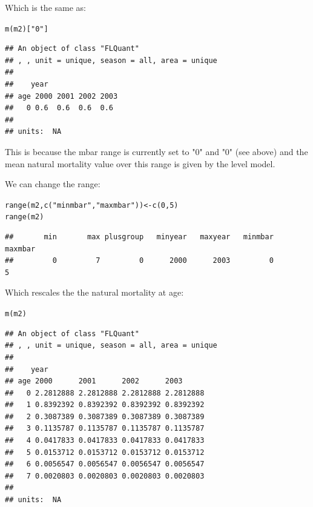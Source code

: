 \documentclass[a4paper,english,10pt]{article}\usepackage[]{graphicx}\usepackage[]{color}
\makeatletter
\newcommand{\hlnum}[1]{\textcolor[rgb]{0.063,0.58,0.627}{#1}}%
\newcommand{\hlstr}[1]{\textcolor[rgb]{0.063,0.58,0.627}{#1}}%
\newcommand{\hlstd}[1]{\textcolor[rgb]{0.196,0.196,0.196}{#1}}%
\newcommand{\hlkwb}[1]{\textcolor[rgb]{0.627,0,0.314}{#1}}%
\newcommand{\hlkwd}[1]{\textcolor[rgb]{0.78,0.227,0.412}{#1}}%
\newenvironment{kframe}{%
 \def\at@end@of@kframe{}%
 \ifinner\ifhmode%
  \def\at@end@of@kframe{\end{minipage}}%
  \begin{minipage}{\columnwidth}%
 \fi\fi%
 \def\FrameCommand##1{\hskip\@totalleftmargin \hskip-\fboxsep
 \colorbox{shadecolor}{##1}\hskip-\fboxsep
     \hskip-\linewidth \hskip-\@totalleftmargin \hskip\columnwidth}%
 \MakeFramed {\advance\hsize-\width
   \@totalleftmargin\z@ \linewidth\hsize
   \@setminipage}}%
 {\par\unskip\endMakeFramed%
 \at@end@of@kframe}
\newenvironment{knitrout}{}{} %
\makeatother
\begin{document}
Which is the same as:

\begin{knitrout}
\color{fgcolor}\begin{kframe}
\begin{alltt}
\hlkwd{m}\hlstd{(m2)[}\hlstr{"0"}\hlstd{]}
\end{alltt}
\begin{verbatim}
## An object of class "FLQuant"
## , , unit = unique, season = all, area = unique
## 
##    year
## age 2000 2001 2002 2003
##   0 0.6  0.6  0.6  0.6 
## 
## units:  NA
\end{verbatim}
\end{kframe}
\end{knitrout}

This is because the mbar range is currently set to "0" and "0" (see above) and the mean natural mortality value over this range is given by the level model. 

We can change the  range:

\begin{knitrout}
\color{fgcolor}\begin{kframe}
\begin{alltt}
\hlkwd{range}\hlstd{(m2,} \hlkwd{c}\hlstd{(}\hlstr{"minmbar"}\hlstd{,} \hlstr{"maxmbar"}\hlstd{))} \hlkwb{<-} \hlkwd{c}\hlstd{(}\hlnum{0}\hlstd{,} \hlnum{5}\hlstd{)}
\hlkwd{range}\hlstd{(m2)}
\end{alltt}
\begin{verbatim}
##       min       max plusgroup   minyear   maxyear   minmbar   maxmbar 
##         0         7         0      2000      2003         0         5
\end{verbatim}
\end{kframe}
\end{knitrout}

Which rescales the the natural mortality at age:

\begin{knitrout}
\color{fgcolor}\begin{kframe}
\begin{alltt}
\hlkwd{m}\hlstd{(m2)}
\end{alltt}
\begin{verbatim}
## An object of class "FLQuant"
## , , unit = unique, season = all, area = unique
## 
##    year
## age 2000      2001      2002      2003     
##   0 2.2812888 2.2812888 2.2812888 2.2812888
##   1 0.8392392 0.8392392 0.8392392 0.8392392
##   2 0.3087389 0.3087389 0.3087389 0.3087389
##   3 0.1135787 0.1135787 0.1135787 0.1135787
##   4 0.0417833 0.0417833 0.0417833 0.0417833
##   5 0.0153712 0.0153712 0.0153712 0.0153712
##   6 0.0056547 0.0056547 0.0056547 0.0056547
##   7 0.0020803 0.0020803 0.0020803 0.0020803
## 
## units:  NA
\end{verbatim}
\end{kframe}
\end{knitrout}
\end{document}
